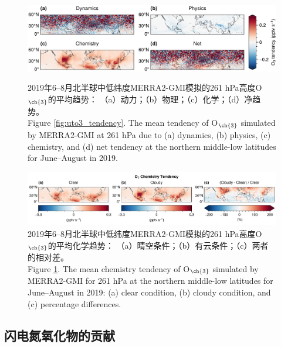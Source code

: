 \begin{landscape}
\vspace*{\fill}
\begin{figure}[H]
    \centering
    \includegraphics[width=0.75\columnwidth]{./figures/uto3_tendency.png}
    \caption{
    2019年6--8月北半球中低纬度MERRA2-GMI模拟的261 hPa高度O$_{\ch{3}}$的平均趋势：
    （a）动力；（b）物理；（c）化学；（d）净趋势。\\
    Figure \ref{fig:uto3_tendency}. The mean tendency of O$_{\ch{3}}$ simulated by MERRA2-GMI at 261 hPa due to (a) dynamics, (b) physics, (c) chemistry, and (d) net tendency at the northern middle-low latitudes for June--August in 2019.
    }
    \label{fig:uto3_tendency}


    \centering
    \includegraphics[width=0.85\columnwidth]{./figures/uto3_chem_tendency.png}
    \caption{
    2019年6--8月北半球中低纬度MERRA2-GMI模拟的261 hPa高度O$_{\ch{3}}$的平均化学趋势：
    （a）晴空条件；（b）有云条件；（c）两者的相对差。\\
    Figure \ref{fig:uto3_chem_tendency}. The mean chemistry tendency of O$_{\ch{3}}$ simulated by MERRA2-GMI for 261 hPa at the northern middle-low latitudes for June--August in 2019:
    (a) clear condition, (b) cloudy condition, and (c) percentage differences.
    }
    \label{fig:uto3_chem_tendency}
\end{figure}
\vspace*{\fill}
\end{landscape}

\subsection{闪电氮氧化物的贡献}

